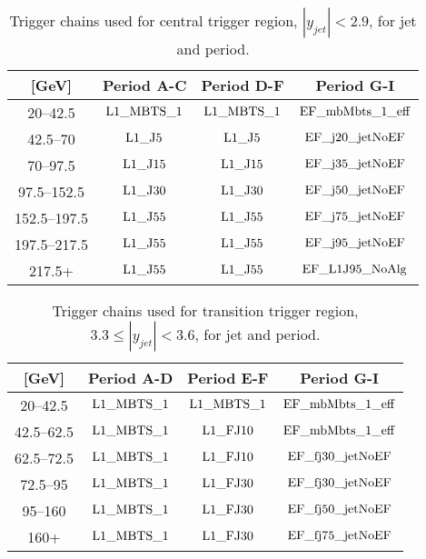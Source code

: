 \begin{table}[htdp]
\centering
\begin{tabular}{ | c | c | c | c | }
  \hline
 \pt{} [GeV] & Period A-C & Period D-F & Period G-I \\
  \hline
20--42.5 &  $ \rm L1\_ MBTS\_ 1$ & $ \rm L1\_ MBTS\_ 1$ & $ \rm EF\_ mbMbts\_ 1\_ eff$  \\
42.5--70 &  $ \rm L1\_ J5$ &     $ \rm L1\_ J5$ &     $ \rm EF\_ j20\_ jetNoEF$  \\
70--97.5 &   $ \rm L1\_ J15$ &    $ \rm L1\_ J15$ &    $ \rm EF\_ j35\_ jetNoEF$  \\
97.5--152.5 &   $ \rm L1\_ J30$ &    $ \rm L1\_ J30$ &    $ \rm EF\_ j50\_ jetNoEF$  \\
152.5--197.5 &  $ \rm L1\_ J55$ &    $ \rm L1\_ J55$ &    $ \rm EF\_ j75\_ jetNoEF$  \\
197.5--217.5 &  $ \rm L1\_ J55$ &    $ \rm L1\_ J55$ &    $ \rm EF\_ j95\_ jetNoEF$  \\
217.5+ &     $ \rm L1\_ J55$ &    $ \rm L1\_ J55$ &    $ \rm EF\_ L1J95\_ NoAlg$ \\

  \hline
\end{tabular}
\caption{
Trigger chains used for central trigger region, $|y_{jet}|<2.9$, for jet \pt{} and period.
\label{tab:CentralTrigger}}
\end{table}%


\begin{table}[htdp]
\centering
\begin{tabular}{ | c | c | c | c | }
\hline
\pt{} [GeV] & Period A-D  & Period E-F & Period G-I \\
      \hline
         20--42.5 &     $ \rm L1\_ MBTS\_ 1$ & $ \rm L1\_ MBTS\_ 1$  &   $ \rm EF\_ mbMbts\_ 1\_ eff$  \\
         42.5--62.5 &   $ \rm L1\_ MBTS\_ 1$ & $ \rm L1\_ FJ10$      &   $ \rm EF\_ mbMbts\_ 1\_ eff$  \\
         62.5--72.5 &   $ \rm L1\_ MBTS\_ 1$ & $ \rm L1\_ FJ10$      &   $ \rm EF\_ fj30\_ jetNoEF$  \\
         72.5--95 &     $ \rm L1\_ MBTS\_ 1$ & $ \rm L1\_ FJ30$      &   $ \rm EF\_ fj30\_ jetNoEF$  \\
         95--160 &      $ \rm L1\_ MBTS\_ 1$ & $ \rm L1\_ FJ30$      &   $ \rm EF\_ fj50\_ jetNoEF$  \\
         160+ &         $ \rm L1\_ MBTS\_ 1$ & $ \rm L1\_ FJ30$      &   $ \rm EF\_ fj75\_ jetNoEF$  \\
         \hline
      \end{tabular}
      \caption{
      Trigger chains used for transition trigger region, $3.3\le|y_{jet}|<3.6$, for jet \pt{} and period.
      \label{tab:TransTrigger}}
\end{table}%

